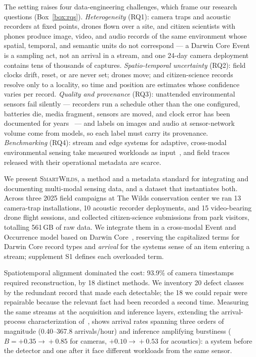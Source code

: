 \documentclass[sigconf]{acmart}
\newcommand{\smartwilds}{\textsc{SmartWilds}\xspace}
\begin{document}
The setting raises four data-engineering challenges, which frame our
research questions (Box~\ref{box:rqs}).
\emph{Heterogeneity} (RQ1): camera traps and acoustic recorders at
fixed points, drones flown over a site, and citizen scientists with
phones produce image, video, and audio records of the same environment
whose spatial, temporal, and semantic units do not correspond --- a Darwin Core Event is a sampling act, not an arrival
in a stream, and one 24-day camera deployment contains tens of
thousands of captures.
\emph{Spatio-temporal uncertainty} (RQ2): field clocks drift, reset, or
are never set; drones move; and citizen-science records resolve only to
a locality, so time and position are estimates whose confidence varies
per record.
\emph{Quality and provenance} (RQ3): unattended environmental sensors fail silently
--- recorders run a schedule other than the one configured, batteries
die, media fragment, sensors are moved, and clock error has been
documented for years~\cite{lahozmonfort2021monitoring,ahumada2020wildlifeinsights}
--- and labels on images and audio at sensor-network volume come from
models, so each label must carry its provenance.
\emph{Benchmarking} (RQ4): stream and edge systems for adaptive,
cross-modal environmental sensing take measured workloads as
input~\cite{kline2024characterizing,kline2026blueprint}, and field
traces released with their operational metadata are scarce.

We present \smartwilds, a method and a metadata standard for
integrating and documenting multi-modal sensing data, and a dataset
that instantiates both. Across three 2025 field campaigns at The Wilds
conservation center we ran 13 camera-trap installations, 10 acoustic
recorder deployments, and 15 video-bearing drone flight sessions, and
collected citizen-science submissions from park visitors, totalling
561\,GB of raw data. We integrate them in a cross-modal Event and
Occurrence model based on Darwin
Core~\cite{wieczorek2012darwincore,tdwgDarwinCore}, reserving the
capitalized terms for Darwin Core record types and \emph{arrival} for
the systems sense of an item entering a stream; supplement S1 defines
each overloaded term.

Spatiotemporal alignment dominated the cost: 93.9\% of camera
timestamps required reconstruction, by 18 distinct methods. We
inventory 20 defect classes by the redundant record that made each
detectable; the 18 we could repair were repairable because the relevant
fact had been recorded a second time. Measuring the same streams at the
acquisition and inference layers, extending the arrival-process
characterization of~\cite{kline2024characterizing,kline2026blueprint},
shows arrival rates spanning three orders of magnitude (0.40--367.8
arrivals/hour) and inference amplifying burstiness
($B{=}+0.35\!\to\!+0.85$ for cameras, $+0.10\!\to\!+0.53$ for
acoustics): a system before the detector and one after it face
different workloads from the same sensor.
\end{document}
